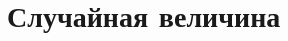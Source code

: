 \documentclass[a4paper]{article}
\begin{document}
	
	\section{Случайная величина}
	\begin{flushreght}
		
	\end{flushreght}
	
\end{document}
